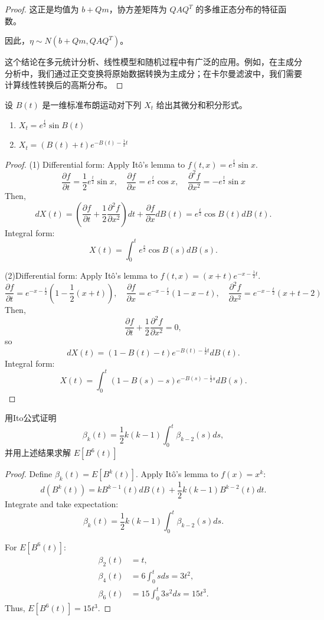 \documentclass[lang=cn,10pt,thmcnt=section]{elegantbook}
\begin{document}
\begin{proof}
		这正是均值为 $b + Qm$，协方差矩阵为 $QAQ^T$ 的多维正态分布的特征函数。
		
		因此，$\eta \sim N(b + Qm, QAQ^T)$。
		
		这个结论在多元统计分析、线性模型和随机过程中有广泛的应用。例如，在主成分分析中，我们通过正交变换将原始数据转换为主成分；在卡尔曼滤波中，我们需要计算线性转换后的高斯分布。
\end{proof}
\begin{example}
	设 $B(t)$ 是一维标准布朗运动对下列 $X_t$ 给出其微分和积分形式。
    \begin{enumerate}
        \item $X_t = e^{\frac{t}{2}} \sin B(t)$
        \item $X_t = (B(t) + t) e^{-B(t) - \frac{1}{2}t}$
    \end{enumerate}
\end{example}
\begin{proof}
	(1) Differential form: Apply Itô's lemma to \( f(t, x) = e^{\frac{t}{2}} \sin x \).
    \[
    \frac{\partial f}{\partial t} = \frac{1}{2} e^{\frac{t}{2}} \sin x, \quad
    \frac{\partial f}{\partial x} = e^{\frac{t}{2}} \cos x, \quad
    \frac{\partial^2 f}{\partial x^2} = -e^{\frac{t}{2}} \sin x
    \]
    Then,
    \[
    dX(t) = \left( \frac{\partial f}{\partial t} + \frac{1}{2} \frac{\partial^2 f}{\partial x^2} \right) dt + \frac{\partial f}{\partial x} dB(t) = e^{\frac{t}{2}} \cos B(t)  dB(t).
    \]
    Integral form: 
    \[
    X(t) = \int_0^t e^{\frac{s}{2}} \cos B(s)  dB(s).
    \]
    
	(2)Differential form: Apply Itô's lemma to \( f(t, x) = (x + t) e^{-x - \frac{1}{2}t} \).
    \[
    \frac{\partial f}{\partial t} = e^{-x - \frac{t}{2}} \left(1 - \frac{1}{2}(x + t)\right), \quad
    \frac{\partial f}{\partial x} = e^{-x - \frac{t}{2}} (1 - x - t), \quad
    \frac{\partial^2 f}{\partial x^2} = e^{-x - \frac{t}{2}} (x + t - 2)
    \]
    Then,
    \[
    \frac{\partial f}{\partial t} + \frac{1}{2} \frac{\partial^2 f}{\partial x^2} = 0,
    \]
    so
    \[
    dX(t) = (1 - B(t) - t) e^{-B(t) - \frac{1}{2}t}  dB(t).
    \]
    Integral form: 
    \[
    X(t) = \int_0^t (1 - B(s) - s) e^{-B(s) - \frac{1}{2}s}  dB(s).
    \]

\end{proof}
\begin{example}
	用Ito公式证明
    \[
    \beta_k(t) = \frac{1}{2} k(k-1) \int_0^t \beta_{k-2}(s) ds,
    \]
    并用上述结果求解 $E[B^6(t)]$
\end{example}
\begin{proof}
	Define \( \beta_k(t) = E[B^k(t)] \). Apply Itô's lemma to \( f(x) = x^k \):
\[
d(B^k(t)) = k B^{k-1}(t)  dB(t) + \frac{1}{2} k(k-1) B^{k-2}(t)  dt.
\]
Integrate and take expectation:
\[
\beta_k(t) = \frac{1}{2} k(k-1) \int_0^t \beta_{k-2}(s)  ds.
\]

For \( E[B^6(t)] \):
\begin{align*}
\beta_2(t) &= t, \\
\beta_4(t) &= 6 \int_0^t s  ds = 3t^2, \\
\beta_6(t) &= 15 \int_0^t 3s^2  ds = 15t^3.
\end{align*}
Thus, \( E[B^6(t)] = 15t^3 \).
\end{proof}
\end{document}
